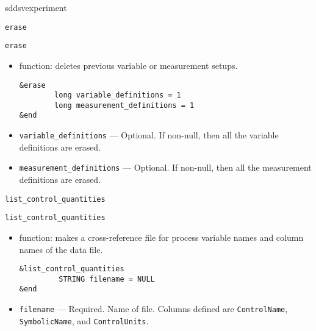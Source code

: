 \begin{sddsprog}{sddsvexperiment}
\begin{itemize}
\begin{latexonly}
\newpage\begin{center}{\Large \verb+erase+}\end{center}
\end{latexonly}
\begin{htmlonly}
\item {\Large \verb+erase+}
\end{htmlonly}
\begin{itemize}
   \item function: deletes previous variable or measurement setups.
\begin{verbatim}
&erase
        long variable_definitions = 1
        long measurement_definitions = 1
&end
\end{verbatim}
   \item {\verb+variable_definitions+} --- Optional. If non-null, then all the variable definitions are erased.
   \item {\verb+measurement_definitions+} --- Optional. If non-null, then all the measurement definitions are erased.
\end{itemize}

\begin{latexonly}
\begin{center}{\Large \verb+list_control_quantities+}\end{center}
\end{latexonly}
\begin{htmlonly}
\item {\Large \verb+list_control_quantities+}
\end{htmlonly}
\begin{itemize}
   \item function: makes a cross-reference file for process variable names and column names of the data file.
\begin{verbatim}
&list_control_quantities
         STRING filename = NULL
&end
\end{verbatim}
   \item {\verb+filename+} --- Required. Name of file. Columns defined are \verb+ControlName+,
                \verb+SymbolicName+, and \verb+ControlUnits+.
\end{itemize}


\end{itemize}
\end{sddsprog}
